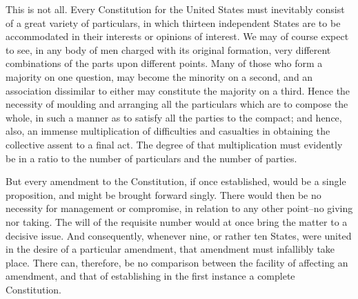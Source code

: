 This is not all. 
Every Constitution for the United States must inevitably consist of a great variety of particulars, in which thirteen independent States are to be accommodated in their interests or opinions of interest. 
We may of course expect to see, in any body of men charged with its original formation, very different combinations of the parts upon different points. 
Many of those who form a majority on one question, may become the minority on a second, and an association dissimilar to either may constitute the majority on a third. 
Hence the necessity of moulding and arranging all the particulars which are to compose the whole, in such a manner as to satisfy all the parties to the compact; and hence, also, an immense multiplication of difficulties and casualties in obtaining the collective assent to a final act. 
The degree of that multiplication must evidently be in a ratio to the number of particulars and the number of parties.

But every amendment to the Constitution, if once established, would be a single proposition, and might be brought forward singly. 
There would then be no necessity for management or compromise, in relation to any other point--no giving nor taking. 
The will of the requisite number would at once bring the matter to a decisive issue. 
And consequently, whenever nine, or rather ten States, were united in the desire of a particular amendment, that amendment must infallibly take place. 
There can, therefore, be no comparison between the facility of affecting an amendment, and that of establishing in the first instance a complete Constitution.

